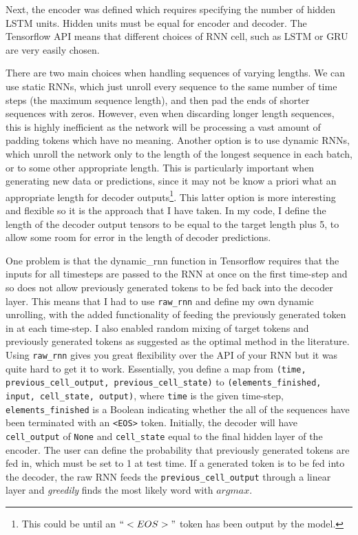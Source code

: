 \documentclass[]{article}
\begin{document}
Next, the encoder was defined which requires specifying the number of hidden LSTM units. Hidden units must be equal for encoder and decoder. The Tensorflow API means that different choices of RNN cell, such as LSTM or GRU are very easily chosen.

There are two main choices when handling sequences of varying lengths. We can use static RNNs, which just unroll every sequence to the same number of time steps (the maximum sequence length), and then pad the ends of shorter sequences with zeros. However, even when discarding longer length sequences, this is highly inefficient as the network will be processing a vast amount of padding tokens which have no meaning. Another option is to use dynamic RNNs, which unroll the network only to the length of the longest sequence in each batch, or to some other appropriate length. This is particularly important when generating new data or predictions, since it may not be know a priori what an appropriate length for decoder outputs\footnote{This could be until an $``<EOS>"$ token has been output by the model.}. This latter option is more interesting and flexible so it is the approach that I have taken. In my code, I define the length of the decoder output tensors to be equal to the target length plus 5, to allow some room for error in the length of decoder predictions.

One problem is that the dynamic\_rnn function in Tensorflow requires that the inputs for all timesteps are passed to the RNN at once on the first time-step and so does not allow previously generated tokens to be fed back into the decoder layer. This means that I had to use \lstinline{raw_rnn} and define my own dynamic unrolling, with the added functionality of feeding the previously generated token in at each time-step. I also enabled random mixing of target tokens and previously generated tokens as suggested as the optimal method in the literature. Using \lstinline{raw_rnn} gives you great flexibility over the API of your RNN but it was quite hard to get it to work. Essentially, you define a map from \lstinline{(time, previous_cell_output, previous_cell_state)}
to \lstinline{(elements_finished, input, cell_state, output)}, where \lstinline{time} is the given time-step, \lstinline{elements_finished} is a Boolean indicating whether the all of the sequences have been terminated with an \lstinline{<EOS>} token. Initially, the decoder will have \lstinline{cell_output} of \lstinline{None} and \lstinline{cell_state} equal to the final hidden layer of the encoder. The user can define the probability that previously generated tokens are fed in, which must be set to 1 at test time. If a generated token is to be fed into the decoder, the raw RNN feeds the \lstinline{previous_cell_output} through a linear layer and \textit{greedily} finds the most likely word with $argmax$.
\end{document}
